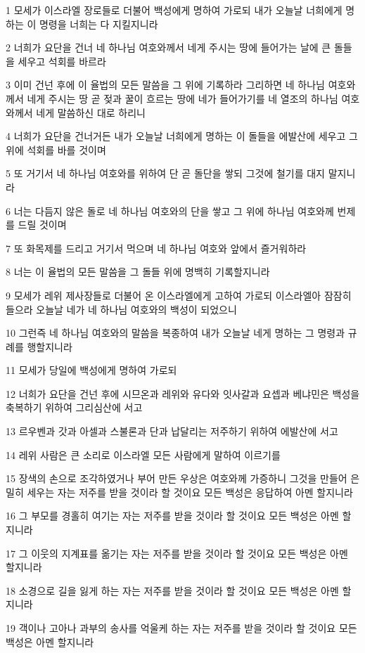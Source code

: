 \par 1 모세가 이스라엘 장로들로 더불어 백성에게 명하여 가로되 내가 오늘날 너희에게 명하는 이 명령을 너희는 다 지킬지니라
\par 2 너희가 요단을 건너 네 하나님 여호와께서 네게 주시는 땅에 들어가는 날에 큰 돌들을 세우고 석회를 바르라
\par 3 이미 건넌 후에 이 율법의 모든 말씀을 그 위에 기록하라 그리하면 네 하나님 여호와께서 네게 주시는 땅 곧 젖과 꿀이 흐르는 땅에 네가 들어가기를 네 열조의 하나님 여호와께서 네게 말씀하신 대로 하리니
\par 4 너희가 요단을 건너거든 내가 오늘날 너희에게 명하는 이 돌들을 에발산에 세우고 그 위에 석회를 바를 것이며
\par 5 또 거기서 네 하나님 여호와를 위하여 단 곧 돌단을 쌓되 그것에 철기를 대지 말지니라
\par 6 너는 다듬지 않은 돌로 네 하나님 여호와의 단을 쌓고 그 위에 하나님 여호와께 번제를 드릴 것이며
\par 7 또 화목제를 드리고 거기서 먹으며 네 하나님 여호와 앞에서 즐거워하라
\par 8 너는 이 율법의 모든 말씀을 그 돌들 위에 명백히 기록할지니라
\par 9 모세가 레위 제사장들로 더불어 온 이스라엘에게 고하여 가로되 이스라엘아 잠잠히 들으라 오늘날 네가 네 하나님 여호와의 백성이 되었으니
\par 10 그런즉 네 하나님 여호와의 말씀을 복종하여 내가 오늘날 네게 명하는 그 명령과 규례를 행할지니라
\par 11 모세가 당일에 백성에게 명하여 가로되
\par 12 너희가 요단을 건넌 후에 시므온과 레위와 유다와 잇사갈과 요셉과 베냐민은 백성을 축복하기 위하여 그리심산에 서고
\par 13 르우벤과 갓과 아셀과 스불론과 단과 납달리는 저주하기 위하여 에발산에 서고
\par 14 레위 사람은 큰 소리로 이스라엘 모든 사람에게 말하여 이르기를
\par 15 장색의 손으로 조각하였거나 부어 만든 우상은 여호와께 가증하니 그것을 만들어 은밀히 세우는 자는 저주를 받을 것이라 할 것이요 모든 백성은 응답하여 아멘 할지니라
\par 16 그 부모를 경홀히 여기는 자는 저주를 받을 것이라 할 것이요 모든 백성은 아멘 할지니라
\par 17 그 이웃의 지계표를 옮기는 자는 저주를 받을 것이라 할 것이요 모든 백성은 아멘 할지니라
\par 18 소경으로 길을 잃게 하는 자는 저주를 받을 것이라 할 것이요 모든 백성은 아멘 할지니라
\par 19 객이나 고아나 과부의 송사를 억울케 하는 자는 저주를 받을 것이라 할 것이요 모든 백성은 아멘 할지니라
